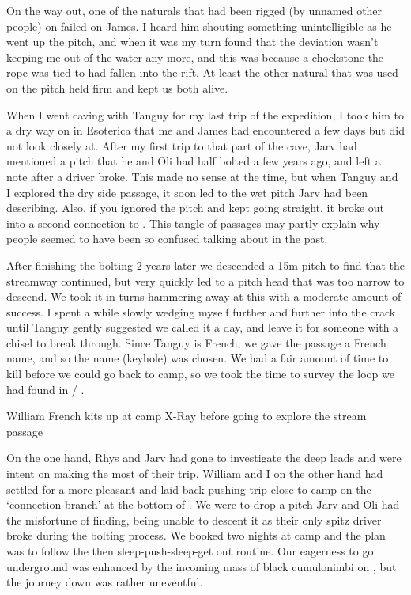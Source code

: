 On the way out, one of the naturals that had been rigged (by unnamed other people) on  failed on James. I heard him shouting something unintelligible as he went up the pitch, and when it was my turn found that the deviation wasn't keeping me out of the water any more, and this was because a chockstone the rope was tied to had fallen into the rift. At least the other natural that was used on the pitch held firm and kept us both alive.


When I went caving with Tanguy for my last trip of the expedition, I took him to a dry way on in Esoterica that me and James had encountered a few days but did not look closely at. After my first trip to that part of the cave, Jarv had mentioned a pitch that he and Oli had half bolted a few years ago, and left a note after a driver broke. This made no sense at the time, but when Tanguy and I explored the dry side passage, it soon led to the wet pitch Jarv had been describing. Also, if you ignored the pitch and kept going straight, it broke out into a second connection to . This tangle of passages may partly explain why people seemed to have been so confused talking about  in the past. 

After finishing the bolting 2 years later we descended a 15m pitch to find that the streamway continued, but very quickly led to a pitch head that was too narrow to descend. We took it in turns hammering away at this with a moderate amount of success. I spent a while slowly wedging myself further and further into the crack until Tanguy gently suggested we called it a day, and leave it for someone with a chisel to break through. Since Tanguy is French, we gave the passage a French name, and so the name  (keyhole) was chosen. We had a fair amount of time to kill before we could go back to camp, so we took the time to survey the loop we had found in  / .

\begin{marginfigure}
\centering
{}
\label{Will at camp}
\caption{William French kits up at camp X-Ray before going to explore the  stream passage }
\end{marginfigure}

On the one hand, Rhys and Jarv had gone to investigate the deep leads and were intent on making the most of their trip. William and I on the other hand had settled for a more pleasant and laid back pushing trip close to camp on the `connection branch' at the bottom of . We were to drop a pitch Jarv and Oli had the misfortune of finding, being unable to descent it as their only spitz driver broke during the bolting process. We booked two nights at camp  and the plan was to follow the then sleep-push-sleep-get out routine. Our eagerness to go underground was enhanced by the incoming mass of black cumulonimbi on , but the journey down was rather uneventful.

